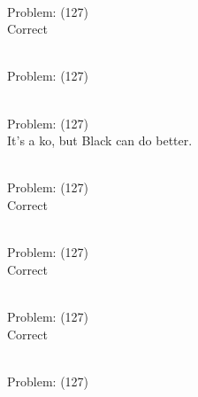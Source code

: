 \documentclass[11pt]{article}
\begin{document}
\begin{minipage}[t]{0.5\textwidth}
  {\centering
  
\\
Problem: (127)\\
Correct\\
  }
\end{minipage}
\begin{minipage}[t]{0.5\textwidth}
  {\centering
  
\\
Problem: (127)\\
  }
\end{minipage}
\begin{minipage}[t]{0.5\textwidth}
  {\centering
  
\\
Problem: (127)\\
It's a ko, but Black can do better.\\
  }
\end{minipage}
\begin{minipage}[t]{0.5\textwidth}
  {\centering
  
\\
Problem: (127)\\
Correct\\
  }
\end{minipage}
\begin{minipage}[t]{0.5\textwidth}
  {\centering
  
\\
Problem: (127)\\
Correct\\
  }
\end{minipage}
\begin{minipage}[t]{0.5\textwidth}
  {\centering
  
\\
Problem: (127)\\
Correct\\
  }
\end{minipage}
\begin{minipage}[t]{0.5\textwidth}
  {\centering
  
\\
Problem: (127)\\
  }
\end{minipage}
\end{document}
